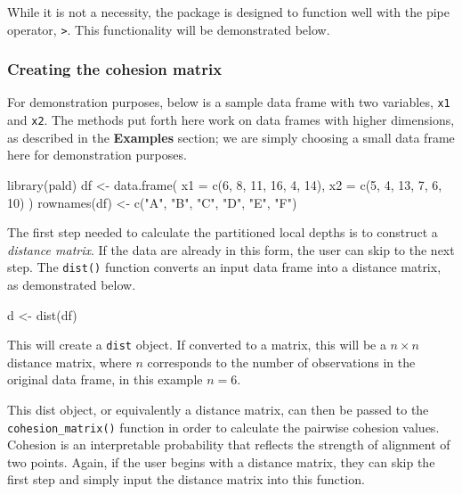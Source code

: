 While it is not a necessity, the  package is designed to
function well with the pipe operator, \texttt{\textbar{}\textgreater{}}.
This functionality will be demonstrated below.

\hypertarget{creating-the-cohesion-matrix}{%
\subsubsection{Creating the cohesion
matrix}\label{creating-the-cohesion-matrix}}

For demonstration purposes, below is a sample data frame with two
variables, \texttt{x1} and \texttt{x2}. The methods put forth here work
on data frames with higher dimensions, as described in the
\textbf{Examples} section; we are simply choosing a small data frame
here for demonstration purposes.

\begin{Schunk}
\begin{Sinput}
library(pald)
df <- data.frame(
  x1 = c(6, 8, 11, 16, 4, 14),
  x2 = c(5, 4, 13, 7, 6, 10)
)
rownames(df) <- c("A", "B", "C", "D", "E", "F")
\end{Sinput}
\end{Schunk}

The first step needed to calculate the partitioned local depths is to
construct a \emph{distance matrix}. If the data are already in this
form, the user can skip to the next step. The \texttt{dist()} function
converts an input data frame into a distance matrix, as demonstrated
below.

\begin{Schunk}
\begin{Sinput}
d <- dist(df)
\end{Sinput}
\end{Schunk}

This will create a \texttt{dist} object. If converted to a matrix, this
will be a \(n\times n\) distance matrix, where \(n\) corresponds to the
number of observations in the original data frame, in this example
\(n = 6\).

This dist object, or equivalently a distance matrix, can then be passed
to the \texttt{cohesion\_matrix()} function in order to calculate the
pairwise cohesion values. Cohesion is an interpretable probability that
reflects the strength of alignment of two points. Again, if the user
begins with a distance matrix, they can skip the first step and simply
input the distance matrix into this function.

